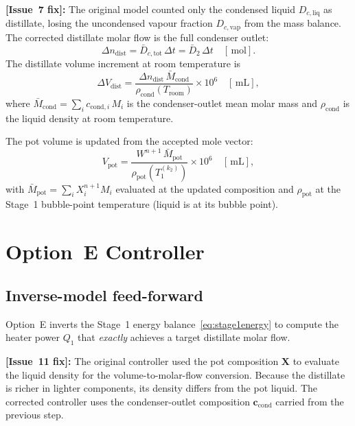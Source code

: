 \documentclass[11pt,letterpaper]{article}
\newcommand{\dt}{\Delta t}
\newcommand{\mol}{\,\text{mol}}
\newcommand{\mL}{\,\text{mL}}
\begin{document}
\textbf{[Issue~7 fix]:} The original model counted only the condensed liquid
$D_{c,\mathrm{liq}}$ as distillate, losing the uncondensed vapour fraction
$D_{c,\mathrm{vap}}$ from the mass balance.  The corrected distillate molar
flow is the full condenser outlet:
\begin{equation}
  \Delta n_{\mathrm{dist}} = \bar{D}_{c,\mathrm{tot}}\,\dt
  = \bar{D}_2\,\dt \quad [\mol].
\end{equation}
The distillate volume increment at room temperature is
\begin{equation}
  \Delta V_{\mathrm{dist}} = \frac{\Delta n_{\mathrm{dist}}\,\bar{M}_{\mathrm{cond}}}
    {\rho_{\mathrm{cond}}(T_{\mathrm{room}})}\times 10^6 \quad [\mL],
  \label{eq:dV}
\end{equation}
where $\bar{M}_{\mathrm{cond}} = \sum_i c_{\mathrm{cond},i}\,M_i$ is the
condenser-outlet mean molar mass and $\rho_{\mathrm{cond}}$ is the liquid
density at room temperature.

The pot volume is updated from the accepted mole vector:
\begin{equation}
  V_{\mathrm{pot}} = \frac{W^{n+1}\,\bar{M}_{\mathrm{pot}}}
    {\rho_{\mathrm{pot}}(T_1^{(k_2)})} \times 10^6 \quad [\mL],
\end{equation}
with $\bar{M}_{\mathrm{pot}} = \sum_i X_i^{n+1} M_i$ evaluated at the
updated composition and $\rho_{\mathrm{pot}}$ at the Stage~1 bubble-point
temperature (liquid is at its bubble point).

\section{Option~E Controller}
\label{sec:controller}

\subsection{Inverse-model feed-forward}

Option~E inverts the Stage~1 energy balance~\cref{eq:stage1energy} to compute
the heater power $Q_1$ that \emph{exactly} achieves a target distillate molar
flow.

\textbf{[Issue~11 fix]:} The original controller used the pot composition
$\mathbf{X}$ to evaluate the liquid density for the volume-to-molar-flow
conversion.  Because the distillate is richer in lighter components, its
density differs from the pot liquid.  The corrected controller uses the
condenser-outlet composition $\mathbf{c}_{\mathrm{cond}}$ carried from the
previous step.
\end{document}

